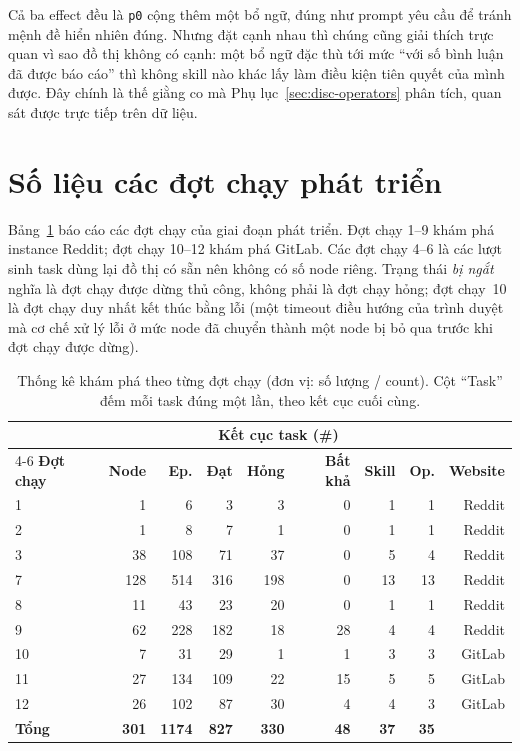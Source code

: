 \noindent
Cả ba effect đều là \texttt{p0} cộng thêm một bổ ngữ, đúng như prompt yêu
cầu để tránh mệnh đề hiển nhiên đúng. Nhưng đặt cạnh nhau thì chúng cũng giải
thích trực quan vì sao đồ thị không có cạnh: một bổ ngữ đặc thù tới mức
``với số bình luận đã được báo cáo'' thì không skill nào khác lấy làm điều
kiện tiên quyết của mình được. Đây chính là thế giằng co mà
Phụ lục~\ref{sec:disc-operators} phân tích, quan sát được trực tiếp trên dữ liệu.

\section{Số liệu các đợt chạy phát triển}
\label{app:runs-dev}

Bảng~\ref{tab:app-runs} báo cáo các đợt chạy của giai đoạn phát triển. Đợt chạy 1--9
khám phá instance Reddit; đợt chạy 10--12 khám phá GitLab. Các đợt chạy 4--6 là các lượt sinh
task dùng lại đồ thị có sẵn nên không có số node riêng. Trạng thái \emph{bị
ngắt} nghĩa là đợt chạy được dừng thủ công, không phải là đợt chạy hỏng; đợt chạy~10 là đợt chạy
duy nhất kết thúc bằng lỗi (một timeout điều hướng của trình duyệt mà cơ chế
xử lý lỗi ở mức node đã chuyển thành một node bị bỏ qua trước khi đợt chạy được
dừng).

\begin{table}[H]
\centering
\caption[Thống kê khám phá theo từng đợt chạy]{Thống kê khám phá theo từng đợt chạy (đơn vị: số lượng / count). Cột
``Task'' đếm mỗi task đúng một lần, theo kết cục cuối cùng.}
\label{tab:app-runs}
\small
\begin{tabular}{@{}lrrrrrrrr@{}}
\toprule
& & & \multicolumn{3}{c}{\textbf{Kết cục task (\#)}} & & & \\
\cmidrule(lr){4-6}
\textbf{Đợt chạy} & \textbf{Node} & \textbf{Ep.} & \textbf{Đạt} & \textbf{Hỏng} &
\textbf{Bất khả} & \textbf{Skill} & \textbf{Op.} & \textbf{Website} \\
\midrule
1  &   1 &   6 &   3 &   3 &  0 &  1 &  1 & Reddit \\
2  &   1 &   8 &   7 &   1 &  0 &  1 &  1 & Reddit \\
3  &  38 & 108 &  71 &  37 &  0 &  5 &  4 & Reddit \\
7  & 128 & 514 & 316 & 198 &  0 & 13 & 13 & Reddit \\
8  &  11 &  43 &  23 &  20 &  0 &  1 &  1 & Reddit \\
9  &  62 & 228 & 182 &  18 & 28 &  4 &  4 & Reddit \\
10 &   7 &  31 &  29 &   1 &  1 &  3 &  3 & GitLab \\
11 &  27 & 134 & 109 &  22 & 15 &  5 &  5 & GitLab \\
12 &  26 & 102 &  87 &  30 &  4 &  4 &  3 & GitLab \\
\midrule
\textbf{Tổng} & \textbf{301} & \textbf{1174} & \textbf{827} & \textbf{330} &
\textbf{48} & \textbf{37} & \textbf{35} & \\
\bottomrule
\end{tabular}
\end{table}

